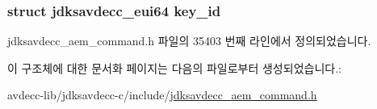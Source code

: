 \subsubsection[{\texorpdfstring{key\+\_\+id}{key_id}}]{\setlength{\rightskip}{0pt plus 5cm}struct {\bf jdksavdecc\+\_\+eui64} key\+\_\+id}\hypertarget{structjdksavdecc__aem__command__auth__add__key__response_a37cbdf6056556ccfaee3ab01dc7c3032}{}\label{structjdksavdecc__aem__command__auth__add__key__response_a37cbdf6056556ccfaee3ab01dc7c3032}


jdksavdecc\+\_\+aem\+\_\+command.\+h 파일의 35403 번째 라인에서 정의되었습니다.



이 구조체에 대한 문서화 페이지는 다음의 파일로부터 생성되었습니다.\+:\begin{DoxyCompactItemize}
\item 
avdecc-\/lib/jdksavdecc-\/c/include/\hyperlink{jdksavdecc__aem__command_8h}{jdksavdecc\+\_\+aem\+\_\+command.\+h}\end{DoxyCompactItemize}
